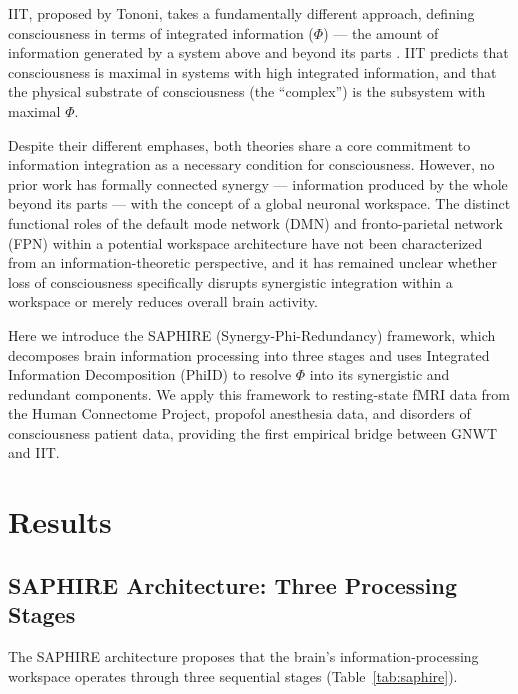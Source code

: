 \documentclass[11pt]{article}
\begin{document}
IIT, proposed by Tononi, takes a fundamentally different approach, defining consciousness in terms of integrated information ($\Phi$) --- the amount of information generated by a system above and beyond its parts \citep{tononi2004information, tononi2016integrated}. IIT predicts that consciousness is maximal in systems with high integrated information, and that the physical substrate of consciousness (the ``complex'') is the subsystem with maximal $\Phi$.

Despite their different emphases, both theories share a core commitment to information integration as a necessary condition for consciousness. However, no prior work has formally connected synergy --- information produced by the whole beyond its parts --- with the concept of a global neuronal workspace. The distinct functional roles of the default mode network (DMN) and fronto-parietal network (FPN) within a potential workspace architecture have not been characterized from an information-theoretic perspective, and it has remained unclear whether loss of consciousness specifically disrupts synergistic integration within a workspace or merely reduces overall brain activity.

Here we introduce the SAPHIRE (Synergy-Phi-Redundancy) framework, which decomposes brain information processing into three stages and uses Integrated Information Decomposition (PhiID) \citep{mediano2021towards} to resolve $\Phi$ into its synergistic and redundant components. We apply this framework to resting-state fMRI data from the Human Connectome Project, propofol anesthesia data, and disorders of consciousness patient data, providing the first empirical bridge between GNWT and IIT.

\section{Results}

\subsection{SAPHIRE Architecture: Three Processing Stages}

The SAPHIRE architecture proposes that the brain's information-processing workspace operates through three sequential stages (Table~\ref{tab:saphire}).
\end{document}

